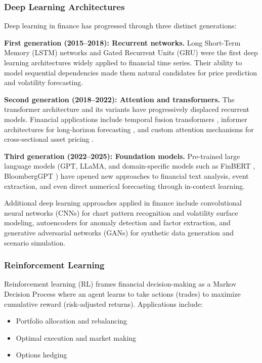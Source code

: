 \subsubsection{Deep Learning Architectures}

Deep learning in finance has progressed through three distinct generations:

\textbf{First generation (2015--2018): Recurrent networks.} Long Short-Term Memory (LSTM) networks \citep{Hochreiter1997} and Gated Recurrent Units (GRU) \citep{Cho2014} were the first deep learning architectures widely applied to financial time series. Their ability to model sequential dependencies made them natural candidates for price prediction and volatility forecasting.

\textbf{Second generation (2018--2022): Attention and transformers.} The transformer architecture \citep{Vaswani2017} and its variants have progressively displaced recurrent models. Financial applications include temporal fusion transformers \citep{Lim2021}, informer architectures for long-horizon forecasting \citep{Zhou2021}, and custom attention mechanisms for cross-sectional asset pricing \citep{Chen2024}.

\textbf{Third generation (2022--2025): Foundation models.} Pre-trained large language models (GPT, LLaMA, and domain-specific models such as FinBERT \citep{Araci2019}, BloombergGPT \citep{Wu2023}) have opened new approaches to financial text analysis, event extraction, and even direct numerical forecasting through in-context learning.

Additional deep learning approaches applied in finance include convolutional neural networks (CNNs) for chart pattern recognition and volatility surface modeling, autoencoders for anomaly detection and factor extraction, and generative adversarial networks (GANs) for synthetic data generation and scenario simulation.

\subsubsection{Reinforcement Learning}

Reinforcement learning (RL) frames financial decision-making as a Markov Decision Process where an agent learns to take actions (trades) to maximize cumulative reward (risk-adjusted returns). Applications include:

\begin{itemize}[leftmargin=*]
    \item Portfolio allocation and rebalancing \citep{Jiang2017, Ye2020}
    \item Optimal execution and market making \citep{Ning2021}
    \item Options hedging \citep{Buehler2019, Cao2021}
\end{itemize}

